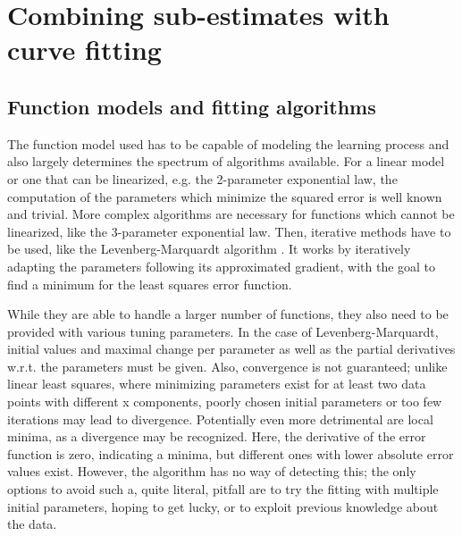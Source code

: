 \section{Combining sub-estimates with curve fitting}

\subsection{Function models and fitting algorithms}
The function model used has to be capable of modeling the learning process and also largely determines the spectrum of algorithms available. For a linear model or one that can be linearized, e.g. the 2-parameter exponential law, the computation of the parameters which minimize the squared error is well known and trivial. More complex algorithms are necessary for functions which cannot be linearized, like the 3-parameter exponential law. Then, iterative methods have to be used, like the Levenberg-Marquardt algorithm \cite{Levenberg1944}. It works by iteratively adapting the parameters following its approximated gradient, with the goal to find a minimum for the least squares error function.

While they are able to handle a larger number of functions, they also need to be provided with various tuning parameters. In the case of Levenberg-Marquardt, initial values and maximal change per parameter as well as the partial derivatives w.r.t. the parameters must be given. Also, convergence is not guaranteed; unlike linear least squares, where minimizing parameters exist for at least two data points with different x components, poorly chosen initial parameters or too few iterations may lead to divergence. Potentially even more detrimental are local minima, as a divergence may be recognized. Here, the derivative of the error function is zero, indicating a minima, but different ones with lower absolute error values exist. However, the algorithm has no way of detecting this; the only options to avoid such a, quite literal, pitfall are to try the fitting with multiple initial parameters, hoping to get lucky, or to exploit previous knowledge about the data.

